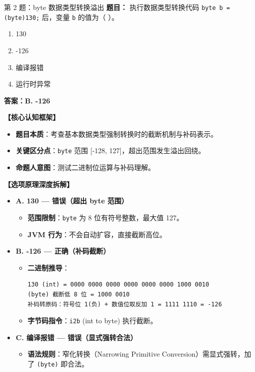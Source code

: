 ﻿\documentclass[12pt, a4paper]{ctexart}
\begin{document}
\begin{bluebox}{第 2 题：byte 数据类型转换溢出}
	\textbf{题目：} 执行数据类型转换代码 \texttt{byte b = (byte)130;} 后，变量 \texttt{b} 的值为（ \quad ）。
	\begin{enumerate}[label=\Alph*., leftmargin=*, nosep]
		\item 130
		\item -126
		\item 编译报错
		\item 运行时异常
	\end{enumerate}

	\textbf{答案：B. -126}

	\textbf{【核心认知框架】}
	\begin{itemize}[leftmargin=*, nosep]
		\item \textbf{题目本质}：考查基本数据类型强制转换时的截断机制与补码表示。
		\item \textbf{关键区分点}：\texttt{byte} 范围 [-128, 127]，超出范围发生溢出回绕。
		\item \textbf{命题人意图}：测试二进制位运算与补码理解。
	\end{itemize}

	\textbf{【选项原理深度拆解】}
	\begin{itemize}[leftmargin=*, nosep]
		\item \textbf{A. 130 — 错误（超出 byte 范围）}
		      \begin{itemize}[leftmargin=*, nosep]
			      \item \textbf{范围限制}：\texttt{byte} 为 8 位有符号整数，最大值 127。
			      \item \textbf{JVM 行为}：不会自动扩容，直接截断高位。
		      \end{itemize}

		\item \textbf{B. -126 — 正确（补码截断）}
		      \begin{itemize}[leftmargin=*, nosep]
			      \item \textbf{二进制推导}：
			            \begin{lstlisting}
130 (int) = 0000 0000 0000 0000 0000 0000 1000 0010
(byte) 截断低 8 位 = 1000 0010
补码转原码：符号位 1(负) + 数值位取反加 1 = 1111 1110 = -126
        \end{lstlisting}
			      \item \textbf{字节码指令}：\texttt{i2b} (int to byte) 执行截断。
		      \end{itemize}

		\item \textbf{C. 编译报错 — 错误（显式强转合法）}
		      \begin{itemize}[leftmargin=*, nosep]
			      \item \textbf{语法规则}：窄化转换（Narrowing Primitive Conversion）需显式强转，加了 \texttt{(byte)} 即合法。
		      \end{itemize}


\end{itemize}
\end{bluebox}
\end{document}
